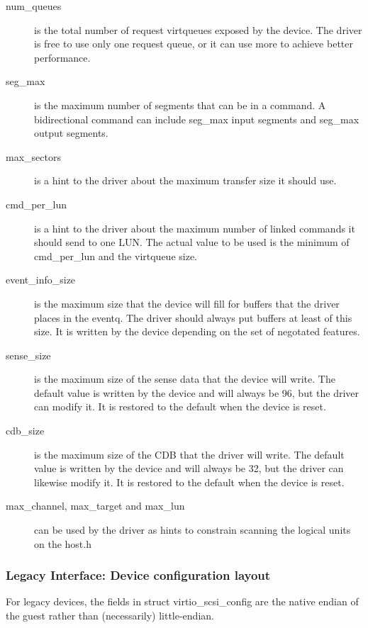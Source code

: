 \begin{description}
\item[num_queues] is the total number of request virtqueues exposed by
    the device. The driver is free to use only one request queue,
    or it can use more to achieve better performance.

\item[seg_max] is the maximum number of segments that can be in a
    command. A bidirectional command can include seg_max input
    segments and seg_max output segments.

\item[max_sectors] is a hint to the driver about the maximum transfer
    size it should use.

\item[cmd_per_lun] is a hint to the driver about the maximum number of
    linked commands it should send to one LUN. The actual value
    to be used is the minimum of cmd_per_lun and the virtqueue
    size.

\item[event_info_size] is the maximum size that the device will fill
    for buffers that the driver places in the eventq. The driver
    should always put buffers at least of this size. It is
    written by the device depending on the set of negotated
    features.

\item[sense_size] is the maximum size of the sense data that the
    device will write. The default value is written by the device
    and will always be 96, but the driver can modify it. It is
    restored to the default when the device is reset.

\item[cdb_size] is the maximum size of the CDB that the driver will
    write. The default value is written by the device and will
    always be 32, but the driver can likewise modify it. It is
    restored to the default when the device is reset.

\item[max_channel, max_target and max_lun] can be used by the driver
    as hints to constrain scanning the logical units on the
    host.h
\end{description}

\subsubsection{Legacy Interface: Device configuration layout}\label{sec:Device Types / SCSI Host Device / Device configuration layout / Legacy Interface: Device configuration layout}
For legacy devices, the fields in struct virtio_scsi_config are the
native endian of the guest rather than (necessarily) little-endian.


